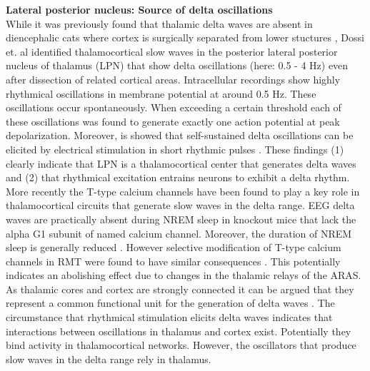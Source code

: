 \textbf{Lateral posterior nucleus: Source of delta oscillations}\\
While it was previously found that thalamic delta waves are absent in diencephalic cats where cortex is surgically separated from lower stuctures \parencite{villablanca2004counterpointing}, Dossi et. al \parencite*{dossi1992electrophysiology} identified thalamocortical slow waves in the posterior lateral posterior nucleus of thalamus (LPN) that show delta oscillations (here: 0.5 - 4 Hz) even after dissection of related cortical areas. Intracellular recordings show highly rhythmical oscillations in membrane potential at around 0.5 Hz. These oscillations occur spontaneously. When exceeding a certain threshold each of these oscillations was found to generate exactly one action potential at peak depolarization. Moreover, is showed that self-sustained delta oscillations can be elicited by electrical stimulation in short rhythmic pulses \parencite{dossi1992electrophysiology}. These findings (1) clearly indicate that LPN is a thalamocortical center that generates delta waves and (2) that rhythmical excitation entrains neurons to exhibit a delta rhythm.\\
More recently the T-type calcium channels have been found to play a key role in thalamocortical circuits that generate slow waves in the delta range. EEG delta waves are practically absent during NREM sleep in knockout mice that lack the alpha G1 subunit of named calcium channel. Moreover, the duration of NREM sleep is generally reduced \parencite{lee2004lack}. However selective modification of T-type calcium channels in RMT were found to have similar consequences \parencite{brown2012control}. This potentially indicates an abolishing effect due to changes in the thalamic relays of the ARAS.\\
As thalamic cores and cortex are strongly connected it can be argued that they represent a common functional unit for the generation of delta waves \parencite{crunelli2018dual}. The circumstance that rhythmical stimulation elicits delta waves indicates that interactions between oscillations in thalamus and cortex exist. Potentially they bind activity in thalamocortical networks. However, the oscillators that produce slow waves in the delta range rely in thalamus.\\

